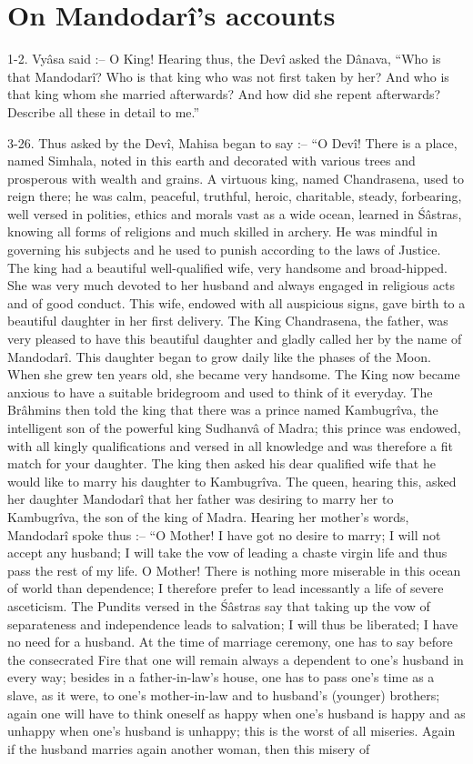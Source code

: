 ﻿\chapter{On Mandodar\^i's accounts}

1-2. Vy\^asa said :-- O King! Hearing thus, the Dev\^i asked the D\^anava, ``Who is that Mandodar\^i? Who is that king who was not first taken by her? And who is that king whom she married afterwards? And how did she repent afterwards? Describe all these in detail to me.''

3-26. Thus asked by the Dev\^i, Mahisa began to say :-- ``O Dev\^i! There is a place, named Simhala, noted in this earth and decorated with various trees and prosperous with wealth and grains. A virtuous king, named Chandrasena, used to reign there; he was calm, peaceful, truthful, heroic, charitable, steady, forbearing, well versed in polities, ethics and morals vast as a wide ocean, learned in \'S\^astras, knowing all forms of religions and much skilled in archery. He was mindful in governing his subjects and he used to punish according to the laws of Justice. The king had a beautiful well-qualified wife, very handsome and broad-hipped. She was very much devoted to her husband and always engaged in religious acts and of good conduct. This wife, endowed with all auspicious signs, gave birth to a beautiful daughter in her first delivery. The King Chandrasena, the father, was very pleased to have this beautiful daughter and gladly called her by the name of Mandodar\^i. This daughter began to grow daily like the phases of the Moon. When she grew ten years old, she became very handsome. The King now became anxious to have a suitable bridegroom and used to think of it everyday. The Br\^ahmins then told the king that there was a prince named Kambugr\^iva, the intelligent son of the powerful king Sudhanv\^a of Madra; this prince was endowed, with all kingly qualifications and versed in all knowledge and was therefore a fit match for your daughter. The king then asked his dear qualified wife that he would like to marry his daughter to Kambugr\^iva. The queen, hearing this, asked her daughter Mandodar\^i that her father was desiring to marry her to Kambugr\^iva, the son of the king of Madra. Hearing her mother's words, Mandodar\^i spoke thus :-- ``O Mother! I have got no desire to marry; I will not accept any husband; I will take the vow of leading a chaste virgin life and thus pass the rest of my life. O Mother! There is nothing more miserable in this ocean of world than dependence; I therefore prefer to lead incessantly a life of severe asceticism. The Pundits versed in the \'S\^astras say that taking up the vow of separateness and independence leads to salvation; I will thus be liberated; I have no need for a husband. At the time of marriage ceremony, one has to say before the consecrated Fire that one will remain always a dependent to one's husband in every way; besides in a father-in-law's house, one has to pass one's time as a slave, as it were, to one's mother-in-law and to husband's (younger) brothers; again one will have to think oneself as happy when one's husband is happy and as unhappy when one's husband is unhappy; this is the worst of all miseries. Again if the husband marries again another woman, then this misery of 